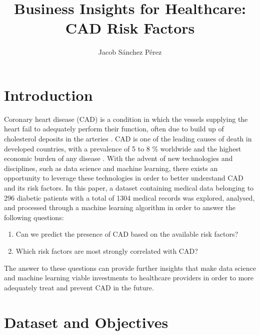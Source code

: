 \documentclass[a4paper,12pt]{article}
\author{Jacob Sánchez Pérez}
\title{Business Insights for Healthcare: CAD Risk Factors}
\begin{document}
\maketitle

\section{Introduction}

Coronary heart disease (CAD) is a condition in which the vessels supplying
the heart fail to adequately perform their function, often due to build up
of cholesterol deposits in the arteries \parencite{NHLBI2022}.
CAD is one of the leading causes of death in developed countries, with
a prevalence of 5 to 8 \% worldwide and the highest economic burden of
any disease \parencite{Bauersachs2019, Liu2002}.
With the advent of new technologies and disciplines, such as data science
and machine learning, there exists an opportunity to leverage these
technologies in order to better understand CAD and its risk factors.
In this paper, a dataset containing medical data belonging to 296 diabetic
patients with a total of 1304 medical records was explored, analysed, and
processed through a machine learning algorithm in order to answer the
following questions:

\begin{enumerate}
 \item Can we predict the presence of CAD based on the available risk factors?
 \item Which risk factors are most strongly correlated with CAD?
\end{enumerate}

The answer to these questions can provide further insights that make data
science and machine learning viable investments to healthcare providers in
order to more adequately treat and prevent CAD in the future.


\section{Dataset and Objectives}
\end{document}
